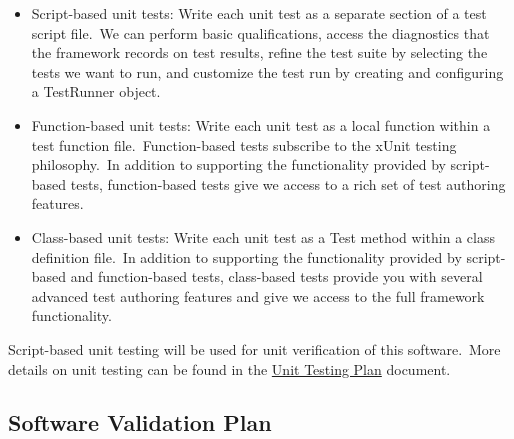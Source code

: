 \documentclass[12pt, titlepage]{article}
\begin{document}
\begin{itemize}
\begin{itemize}
\item Script-based unit tests: Write each unit test as a separate section of a test script file.\ We can perform basic qualifications, access the diagnostics that the framework records on test results, refine the test suite by selecting the tests we want to run, and customize the test run by creating and configuring a TestRunner object.
\item Function-based unit tests: Write each unit test as a local function within a test function file.\ Function-based tests subscribe to the xUnit testing philosophy.\ In addition to supporting the functionality provided by script-based tests, function-based tests give we access to a rich set of test authoring features. 

\item Class-based unit tests: Write each unit test as a Test method within a class definition file.\ In addition to supporting the functionality provided by script-based and function-based tests, class-based tests provide you with several advanced test authoring features and give we access to the full framework functionality.  
\end{itemize}

Script-based unit testing will be used for unit verification of this software.\ More details on unit testing can be found in the \href{https://github.com/LeilaMousapour/Brain-Computer-Interface-/tree/master/docs/VnVPlan/UnitVnVPlan}{Unit Testing Plan} document.
\end{itemize}


%

\subsection{Software Validation Plan}
\end{document}
